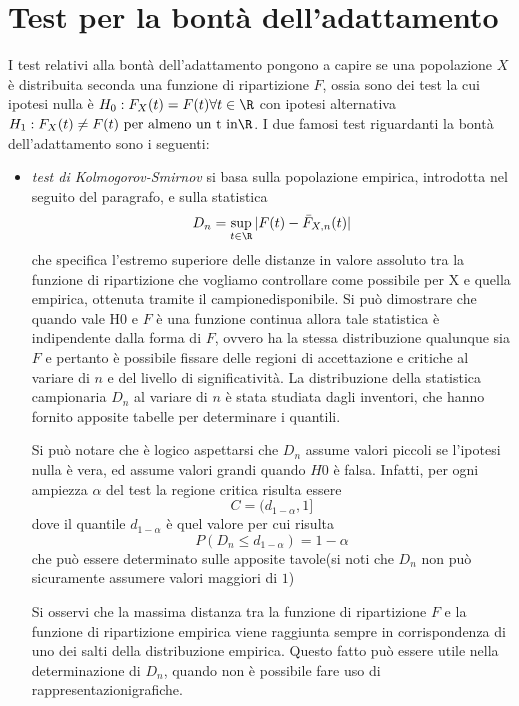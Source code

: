 \section{Test per la bontà dell'adattamento}
I test relativi alla bontà dell'adattamento pongono a capire se una popolazione $X$ è distribuita seconda una funzione
di ripartizione $F$, ossia sono dei test la cui ipotesi nulla è $H_0:F_X(t) = F(t) \forall t \in \R$ con ipotesi
alternativa $H_1:F_X(t) \neq F(t) \mbox{ per almeno un t in} \R$.\newline
I due famosi test riguardanti la bontà dell'adattamento sono i seguenti:
\begin{itemize}
    \item \emph{test di Kolmogorov-Smirnov} si basa sulla popolazione empirica, introdotta nel seguito del paragrafo, e
        sulla statistica
        \[ D_n = \sup _{t \in \R} |F(t) - \bar{F}_{X, n}(t)| \]
        che specifica l’estremo superiore delle distanze in valore assoluto tra la funzione di ripartizione che vogliamo
        controllare come possibile per X e quella empirica, ottenuta tramite il campionedisponibile.\newline
        Si può dimostrare che quando vale H0 e $F$ è una funzione continua allora tale statistica è indipendente 
        dalla forma di $F$, ovvero ha la stessa distribuzione qualunque sia $F$ e pertanto è possibile fissare delle 
        regioni di accettazione e critiche al variare di $n$ e del livello di significatività.\newline
        La distribuzione della statistica campionaria $D_n$ al variare di $n$ è stata studiata dagli inventori,
        che hanno fornito apposite tabelle per determinare i quantili.

        Si può notare che è logico aspettarsi che  $D_n$ assume valori piccoli se l’ipotesi nulla è vera, ed assume 
        valori grandi quando $H0$ è falsa.\newline
        Infatti, per ogni ampiezza $\alpha$ del test la regione critica risulta essere
        \[ C = (d_{1 - \alpha}, 1] \]
        dove il quantile $d_{1 - \alpha}$ è quel valore per cui risulta 
        \[ P(D_n \leq d_{1 - \alpha}) = 1 - \alpha \]
        che può essere determinato sulle apposite tavole(si noti che $D_n$ non può sicuramente assumere valori maggiori di $1$)

        Si osservi che la massima distanza tra la funzione di ripartizione $F$ e la funzione di ripartizione empirica 
        viene raggiunta sempre in corrispondenza di uno dei salti della distribuzione empirica.\newline
        Questo fatto può essere utile nella determinazione di $D_n$, quando non è possibile fare uso di rappresentazionigrafiche.
        

\end{itemize}

